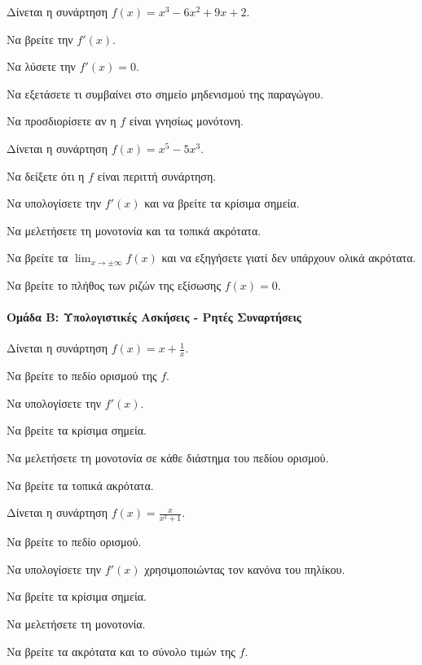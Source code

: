 \documentclass[11pt,a4paper,modern]{FFExercises}
\begin{document}
\askhsh
Δίνεται η συνάρτηση $f(x) = x^3 - 6x^2 + 9x + 2$.
\begin{alist}
    \item Να βρείτε την $f'(x)$.
    \item Να λύσετε την $f'(x) = 0$.
    \item Να εξετάσετε τι συμβαίνει στο σημείο μηδενισμού της παραγώγου.
    \item Να προσδιορίσετε αν η $f$ είναι γνησίως μονότονη.
\end{alist}

\askhsh
Δίνεται η συνάρτηση $f(x) = x^5 - 5x^3$.
\begin{alist}
    \item Να δείξετε ότι η $f$ είναι περιττή συνάρτηση.
    \item Να υπολογίσετε την $f'(x)$ και να βρείτε τα κρίσιμα σημεία.
    \item Να μελετήσετε τη μονοτονία και τα τοπικά ακρότατα.
    \item Να βρείτε τα $\lim_{x \to \pm\infty} f(x)$ και να εξηγήσετε γιατί δεν υπάρχουν ολικά ακρότατα.
    \item Να βρείτε το πλήθος των ριζών της εξίσωσης $f(x) = 0$.
\end{alist}

\paragraph{Ομάδα Β: Υπολογιστικές Ασκήσεις - Ρητές Συναρτήσεις}

\askhsh
Δίνεται η συνάρτηση $f(x) = x + \frac{1}{x}$.
\begin{alist}
    \item Να βρείτε το πεδίο ορισμού της $f$.
    \item Να υπολογίσετε την $f'(x)$.
    \item Να βρείτε τα κρίσιμα σημεία.
    \item Να μελετήσετε τη μονοτονία σε κάθε διάστημα του πεδίου ορισμού.
    \item Να βρείτε τα τοπικά ακρότατα.
\end{alist}

\askhsh
Δίνεται η συνάρτηση $f(x) = \frac{x}{x^2+1}$.
\begin{alist}
    \item Να βρείτε το πεδίο ορισμού.
    \item Να υπολογίσετε την $f'(x)$ χρησιμοποιώντας τον κανόνα του πηλίκου.
    \item Να βρείτε τα κρίσιμα σημεία.
    \item Να μελετήσετε τη μονοτονία.
    \item Να βρείτε τα ακρότατα και το σύνολο τιμών της $f$.
\end{alist}
\end{document}
